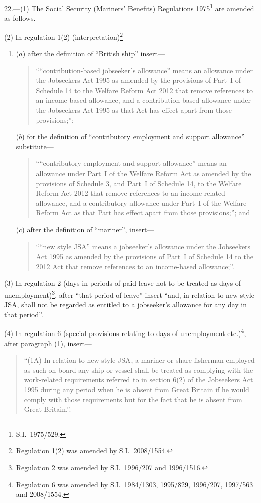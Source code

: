 \documentclass[12pt,a4paper]{article}
\begin{document}
22.—(1) The Social Security (Mariners’ Benefits) Regulations 1975\footnote{S.I.~1975/529.} are amended as follows.

(2) In regulation 1(2) (interpretation)\footnote{Regulation 1(2) was amended by S.I.~2008/1554.}—
\begin{enumerate}\item[]
($a$) after the definition of “British ship” insert—
\begin{quotation}
““contribution-based jobseeker’s allowance” means an allowance under the Jobseekers Act 1995 as amended by the provisions of Part~I of Schedule 14 to the Welfare Reform Act 2012 that remove references to an income-based allowance, and a contribution-based allowance under the Jobseekers Act 1995 as that Act has effect apart from those provisions;”;
\end{quotation}

($b$) for the definition of “contributory employment and support allowance” substitute—
\begin{quotation}
““contributory employment and support allowance” means an allowance under Part~I of the Welfare Reform Act as amended by the provisions of Schedule 3, and Part~I of Schedule 14, to the Welfare Reform Act 2012 that remove references to an income-related allowance, and a contributory allowance under Part~I of the Welfare Reform Act as that Part has effect apart from those provisions;”; and
\end{quotation}

($c$) after the definition of “mariner”, insert—
\begin{quotation}
““new style JSA” means a jobseeker’s allowance under the Jobseekers Act 1995 as amended by the provisions of Part~I of Schedule 14 to the 2012 Act that remove references to an income-based allowance;”.
\end{quotation}
\end{enumerate}

(3) In regulation 2 (days in periods of paid leave not to be treated as days of unemployment)\footnote{Regulation 2 was amended by S.I.~1996/207 and 1996/1516.}, after “that period of leave” insert “and, in relation to new style JSA, shall not be regarded as entitled to a jobseeker’s allowance for any day in that period”.

(4) In regulation 6 (special provisions relating to days of unemployment etc.)\footnote{Regulation 6 was amended by S.I.~1984/1303, 1995/829, 1996/207, 1997/563 and 2008/1554.}, after paragraph (1), insert—
\begin{quotation}
“(1A) In relation to new style JSA, a mariner or share fisherman employed as such on board any ship or vessel shall be treated as complying with the work-related requirements referred to in section 6(2) of the Jobseekers Act 1995 during any period when he is absent from Great Britain if he would comply with those requirements but for the fact that he is absent from Great Britain.”.
\end{quotation}
\end{document}
